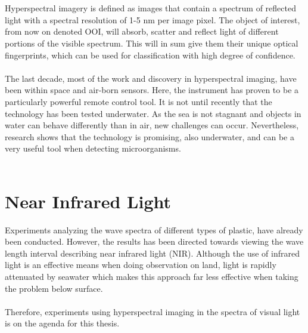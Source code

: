 \\\\
Hyperspectral imagery is defined as images that contain a spectrum of reflected light with a spectral resolution of 1-5 nm per image pixel. The object of interest, from now on denoted OOI, will absorb, scatter and reflect light of different portions of the visible spectrum. This will in sum give them their unique optical fingerprints, which can be used for classification with high degree of confidence.
\\\\
The last decade, most of the work and discovery in hyperspectral imaging, have been within space and air-born sensors. Here, the instrument has proven to be a particularly powerful remote control tool. It is not until recently that the technology has been tested underwater. As the sea is not stagnant and objects in water can behave differently than in air, new challenges can occur. Nevertheless, research shows that the technology is promising, also underwater, and can be a very useful tool when detecting microorganisms.
\\\\

\section{Near Infrared Light}


Experiments analyzing the wave spectra of different types of plastic, have already been conducted. However, the results has been directed towards viewing the wave length interval describing near infrared light (NIR). Although the use of infrared light is an effective means when doing observation on land, light is rapidly attenuated by seawater which makes this approach far less effective when taking the problem below surface.
\\\\
Therefore, experiments using hyperspectral imaging in the spectra of visual light is on the agenda for this thesis. 
\\\\

